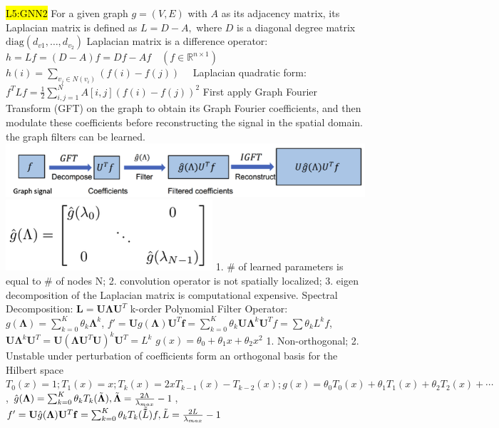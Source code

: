 \hl{L5:GNN2}
 For a given graph \( g = (V, E) \) with \( A \) as its adjacency matrix, its Laplacian matrix is defined as \( L = D - A, \) where \( D \) is a diagonal degree matrix \( \text{diag}(d_{v1}, \dots, d_{v_2}) \) 
Laplacian matrix is a difference operator:
\( h = Lf = (D - A)f = Df - Af \quad (f \in \mathbb{R}^{n \times 1}) \)
\( h(i) = \sum_{ v_j \in N(v_i)}(f(i) - f(j)) \quad  \)
Laplacian quadratic form: \( f^T L f = \frac{1}{2} \sum_{i,j=1}^{N} A[i,j](f(i) - f(j))^2 \)
  First apply Graph Fourier Transform (GFT) on the graph to obtain its Graph Fourier coefficients, and then modulate these coefficients before reconstructing the signal in the spatial domain. the graph filters can be learned.
\includegraphics[height=0.02\textwidth]{figs/l5-1.png}
\includegraphics[height=0.018\textwidth]{figs/l5-2.png}
 1. \# of learned parameters is equal to \# of nodes N; 2. convolution operator is not spatially localized; 3. eigen decomposition of the Laplacian matrix is computational expensive.
Spectral Decomposition:
\(
\mathbf{L} = \mathbf{U} \mathbf{\Lambda} \mathbf{U}^T
\)
k-order Polynomial Filter Operator:
\(
g(\mathbf{\Lambda}) = \sum_{k=0}^{K} \theta_k \mathbf{\Lambda}^k
\), 
\(f'= \mathbf{U} g(\mathbf{\Lambda}) \mathbf{U}^T \mathbf{f}
= \sum_{k=0}^{K} \theta_k \mathbf{U} \mathbf{\Lambda}^k\mathbf{U}^T f=\sum \theta_kL^kf
\), 
\(\mathbf{U} \mathbf{\Lambda}^k\mathbf{U}^T = \mathbf{U} (\mathbf{\Lambda}\mathbf{U}^T\mathbf{U})^k\mathbf{U}^T = L^k\)
 $g(x)=\theta_0 + \theta_1x+\theta_2x^2$ 1. Non-orthogonal; 2. Unstable under perturbation of coefficients
 form an orthogonal basis for the Hilbert space
\(
T_0(x) = 1;
T_1(x) = x;
T_k(x)= 2xT_{k-1}( x) - T_{k-2}(x);
g (x) = \theta_0 T_0( x) + \theta_1 T_1( x) + \theta_2 T_2 (x) + \cdots
\), 
\(
\hat{g}(\mathbf{\Lambda}) = \sum_{k=0}^{K} \theta_k T_k(\Tilde{\mathbf{\Lambda}}), \Tilde{\mathbf{\Lambda}}=\frac{2\Lambda}{\lambda_{max}}-1
\),
\(f'= \mathbf{U} \hat{g}(\mathbf{\Lambda}) \mathbf{U}^T \mathbf{f} = \sum_{k=0}^{K} \theta_k T_k(\Tilde{\mathbf{\Tilde{L}}})f, \Tilde{L} =  \frac{2L}{\lambda_{max}}-1\)
